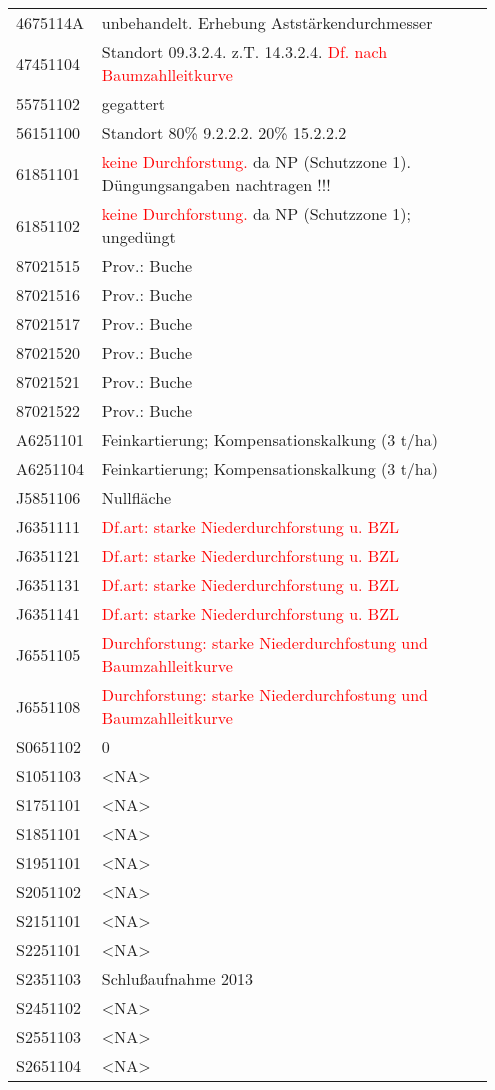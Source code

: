 \begin{singlespace}
{\begin{longtabu}{p{0.15\linewidth} p{0.8\linewidth}}
      4675114A & unbehandelt. Erhebung Aststärkendurchmesser \\
      47451104 & Standort 09.3.2.4. z.T. 14.3.2.4. \textcolor{red}{Df. nach Baumzahlleitkurve} \\
      55751102 & gegattert \\
      56151100 & Standort 80\% 9.2.2.2. 20\% 15.2.2.2 \\
      61851101 & \textcolor{red}{keine Durchforstung.} da NP (Schutzzone 1). Düngungsangaben nachtragen !!! \\
      61851102 & \textcolor{red}{keine Durchforstung.} da NP (Schutzzone 1); ungedüngt \\
      87021515 & Prov.: Buche \\
      87021516 & Prov.: Buche \\
      87021517 & Prov.: Buche \\
      87021520 & Prov.: Buche \\
      87021521 & Prov.: Buche \\
      87021522 & Prov.: Buche \\
      A6251101 & Feinkartierung; Kompensationskalkung (3 t/ha) \\
      A6251104 & Feinkartierung; Kompensationskalkung (3 t/ha) \\
      J5851106 & Nullfläche \\
      J6351111 & \textcolor{red}{Df.art: starke Niederdurchforstung u. BZL} \\
      J6351121 & \textcolor{red}{Df.art: starke Niederdurchforstung u. BZL} \\
      J6351131 & \textcolor{red}{Df.art: starke Niederdurchforstung u. BZL} \\
      J6351141 & \textcolor{red}{Df.art: starke Niederdurchforstung u. BZL} \\
      J6551105 & \textcolor{red}{Durchforstung: starke Niederdurchfostung und Baumzahlleitkurve} \\
      J6551108 & \textcolor{red}{Durchforstung: starke Niederdurchfostung und Baumzahlleitkurve} \\
      S0651102 & 0 \\
      S1051103 & <NA> \\
      S1751101 & <NA> \\
      S1851101 & <NA> \\
      S1951101 & <NA> \\
      S2051102 & <NA> \\
      S2151101 & <NA> \\
      S2251101 & <NA> \\
      S2351103 & Schlußaufnahme 2013 \\
      S2451102 & <NA> \\
      S2551103 & <NA> \\
      S2651104 & <NA> \\
    \end{longtabu}
  }
\end{singlespace}


